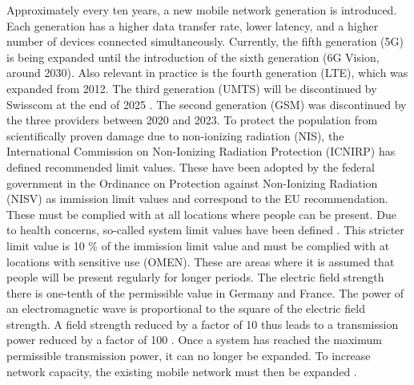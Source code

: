 \begin{English}
    Approximately every ten years, a new mobile network generation is introduced. Each generation has a higher data transfer rate, lower latency, and a higher number of devices connected simultaneously. Currently, the fifth generation (5G) is being expanded until the introduction of the sixth generation (6G Vision, around 2030). Also relevant in practice is the fourth generation (LTE), which was expanded from 2012. The third generation (UMTS) will be discontinued by Swisscom at the end of 2025 \cite{swisscomAbschaltung3GErneuerung}. The second generation (GSM) was discontinued by the three providers between 2020 and 2023.
    To protect the population from scientifically proven damage due to non-ionizing radiation (NIS), the International Commission on Non-Ionizing Radiation Protection (ICNIRP) has defined recommended limit values. These have been adopted by the federal government in the Ordinance on Protection against Non-Ionizing Radiation (NISV) as immission limit values and correspond to the EU recommendation. These must be complied with at all locations where people can be present. Due to health concerns, so-called system limit values have been defined \cite{baumannMitVerordnungUeber2005}. This stricter limit value is 10 \% of the immission limit value and must be complied with at locations with sensitive use (OMEN). These are areas where it is assumed that people will be present regularly for longer periods. The electric field strength there is one-tenth of the permissible value in Germany and France. The power of an electromagnetic wave is proportional to the square of the electric field strength. A field strength reduced by a factor of 10 thus leads to a transmission power reduced by a factor of 100 \cite{chance5gAnlagegrenzwerteImMobilfunk}.
    Once a system has reached the maximum permissible transmission power, it can no longer be expanded. To increase network capacity, the existing mobile network must then be expanded \cite{bundesratNachhaltigesMobilfunknetzBericht2022}.
\end{English}


